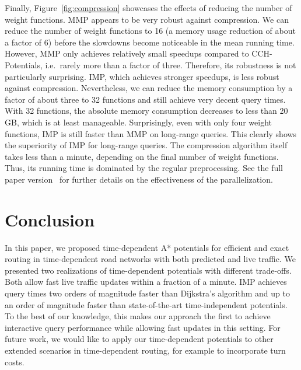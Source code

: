 \documentclass[a4paper,UKenglish,cleveref, autoref, thm-restate]{lipics-v2021}
\begin{document}
Finally, Figure~\ref{fig:compression} showcases the effects of reducing the number of weight functions.
MMP appears to be very robust against compression.
We can reduce the number of weight functions to 16 (a memory usage reduction of about a factor of 6) before the slowdowns become noticeable in the mean running time.
However, MMP only achieves relatively small speedups compared to CCH-Potentials, i.e.\ rarely more than a factor of three.
Therefore, its robustness is not particularly surprising.
IMP, which achieves stronger speedups, is less robust against compression.
Nevertheless, we can reduce the memory consumption by a factor of about three to 32 functions and still achieve very decent query times.
With 32 functions, the absolute memory consumption decreases to less than 20\,GB, which is at least manageable.
Surprisingly, even with only four weight functions, IMP is still faster than MMP on long-range queries.
This clearly shows the superiority of IMP for long-range queries.
The compression algorithm itself takes less than a minute, depending on the final number of weight functions.
Thus, its running time is dominated by the regular preprocessing.
See the full paper version~\cite{wz-cplttdap-22} for further details on the effectiveness of the parallelization.

\section{Conclusion}

In this paper, we proposed time-dependent A* potentials for efficient and exact routing in time-dependent road networks with both predicted and live traffic.
We presented two realizations of time-dependent potentials with different trade-offs.
Both allow fast live traffic updates within a fraction of a minute.
IMP achieves query times two orders of magnitude faster than Dijkstra's algorithm and up to an order of magnitude faster than state-of-the-art time-independent potentials.
To the best of our knowledge, this makes our approach the first to achieve interactive query performance while allowing fast updates in this setting.
For future work, we would like to apply our time-dependent potentials to other extended scenarios in time-dependent routing, for example to incorporate turn costs.

\end{document}
